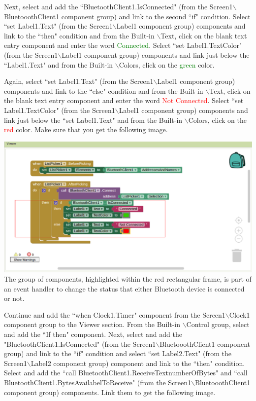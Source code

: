 \documentclass[journal,12pt,twocolumn]{IEEEtran}
\begin{document}
\begin{problem}
Next, select and add the ``BluetoothClient1.IsConnected" (from the Screen1$\backslash$BluetooothClient1 component group) and link to the second ``if" condition. Select ``set Label1.Text" (from the Screen1$\backslash$Label1 component group) components and link to the ``then" condition and from the Built-in $\backslash$Text, click on the blank text entry component and enter the word \textcolor{green}{Connected}. Select ``set Label1.TextColor" (from the Screen1$\backslash$Label1 component group) components and link just below the ``Label1.Text" and from the Built-in $\backslash$Colors, click on the \textcolor{green}{green} color.
\end{problem}
%
\begin{problem}
Again, select ``set Label1.Text" (from the Screen1$\backslash$Label1 component group) components and link to the ``else" condition and from the Built-in $\backslash$Text, click on the blank text entry component and enter the word \textcolor{red}{Not Connected}. Select ``set Label1.TextColor" (from the Screen1$\backslash$Label1 component group) components and link just below the ``set Label1.Text" and from the Built-in $\backslash$Colors, click on the \textcolor{red}{red} color. Make sure that you get the following image.
%
\end{problem}
\includegraphics[width=\columnwidth]{./figs/11.png.eps}
\\
The group of components, highlighted within the red rectangular frame, is part of an event handler to change the status that either Bluetooth device is connected or not.
\begin{problem}
Continue and add the ``when Clock1.Timer" component from the Screen1$\backslash$Clock1 component group to the Viewer section. From the Built-in $\backslash$Control group, select and add the ``If then" component. Next, select and add the "BluetoothClient1.IsConnected" (from the Screen1$\backslash$BluetooothClient1 component group) and link to the ``if" condition and select ``set Label2.Text" (from the Screen1$\backslash$Label2 component group) component and link to the ``then" condition. Select and add the ``call BluetoothClient1.ReceiveTextnumberOfBytes" and ``call BluetoothClient1.BytesAvailabelToReceive" (from the Screen1$\backslash$BluetooothClient1 component group) components. Link them to get the following image.
%
\end{problem}
\end{document}
